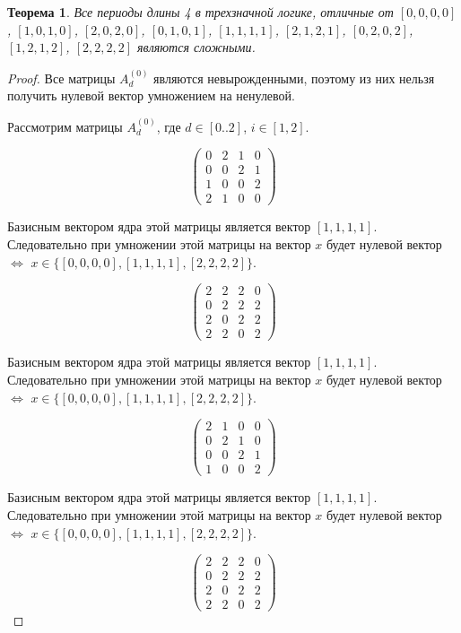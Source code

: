 \documentclass[bibliography=totoc, a4paper, 14pt]{extarticle}
\newtheorem{myth}{Теорема}
\begin{document}
\begin{myth}
Все периоды длины 4 в трехзначной логике, отличные от
$[0, 0, 0, 0]$, $[1, 0, 1, 0]$, $[2, 0, 2, 0]$, $[0, 1, 0, 1]$, $[1, 1, 1, 1]$, $[2, 1, 2, 1]$,
$[0, 2, 0, 2]$, $[1, 2, 1, 2]$, $[2, 2, 2, 2]$ являются сложными.
\end{myth}
\begin{proof}
Все матрицы $A_d^{(0)}$ являются невырожденными, поэтому из них нельзя получить нулевой вектор
умножением на ненулевой.

Рассмотрим матрицы $A_d^{(0)}$, где $d \in [0..2]$, $i \in [1,2]$.

$$ \begin{pmatrix}
0 & 2 & 1 & 0 \\
0 & 0 & 2 & 1 \\
1 & 0 & 0 & 2 \\
2 & 1 & 0 & 0
\end{pmatrix} $$

Базисным вектором ядра этой матрицы является вектор $[1, 1, 1, 1]$. Следовательно при умножении этой матрицы на
вектор $x$ будет нулевой вектор $\Leftrightarrow$ $x \in \{[0, 0, 0, 0], [1, 1, 1, 1], [2, 2, 2, 2]\}$.

$$ \begin{pmatrix}
2 & 2 & 2 & 0 \\
0 & 2 & 2 & 2 \\
2 & 0 & 2 & 2 \\
2 & 2 & 0 & 2
\end{pmatrix} $$

Базисным вектором ядра этой матрицы является вектор $[1, 1, 1, 1]$. Следовательно при умножении этой матрицы на
вектор $x$ будет нулевой вектор $\Leftrightarrow$ $x \in \{[0, 0, 0, 0], [1, 1, 1, 1], [2, 2, 2, 2]\}$.

$$ \begin{pmatrix}
2 & 1 & 0 & 0 \\
0 & 2 & 1 & 0 \\
0 & 0 & 2 & 1 \\
1 & 0 & 0 & 2
\end{pmatrix} $$

Базисным вектором ядра этой матрицы является вектор $[1, 1, 1, 1]$. Следовательно при умножении этой матрицы на
вектор $x$ будет нулевой вектор $\Leftrightarrow$ $x \in \{[0, 0, 0, 0], [1, 1, 1, 1], [2, 2, 2, 2]\}$.

$$ \begin{pmatrix}
2 & 2 & 2 & 0 \\
0 & 2 & 2 & 2 \\
2 & 0 & 2 & 2 \\
2 & 2 & 0 & 2
\end{pmatrix} $$


\end{proof}
\end{document}
